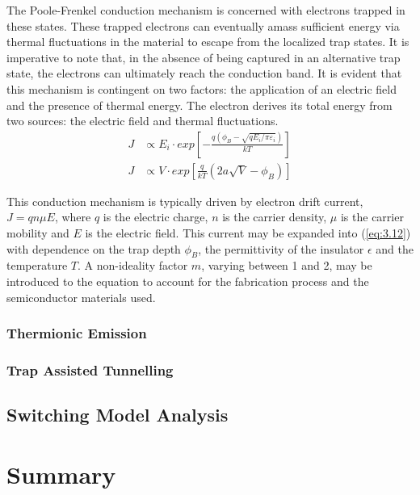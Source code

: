 \noindent The Poole-Frenkel conduction mechanism is concerned with electrons trapped in these states. These trapped electrons can eventually amass sufficient energy via thermal fluctuations in the material to escape from the localized trap states. It is imperative to note that, in the absence of being captured in an alternative trap state, the electrons can ultimately reach the conduction band. It is evident that this mechanism is contingent on two factors: the application of an electric field and the presence of thermal energy. The electron derives its total energy from two sources: the electric field and thermal fluctuations.
\begin{align}
    J &\propto E_i \cdot exp \left[ -\frac{q(\phi _{B} - \sqrt{qE_i/\pi \varepsilon _i} )}{kT} \right] \label{eq:3.12} \\
    J &\propto V \cdot exp \left[ \frac{q}{kT} \left( 2a\sqrt{V} - \phi _{B} \right) \right] \label{eq:3.13} 
\end{align}

\noindent This conduction mechanism is typically driven by electron drift current, $J=qn\mu E$, where $q$ is the electric charge, $n$ is the carrier density, $\mu$ is the carrier mobility and $E$ is the electric field. This current may be expanded into (\ref{eq:3.12}) with dependence on the trap depth $\phi_B$, the permittivity of the insulator $\epsilon$ and the temperature $T$. A non-ideality factor $m$, varying between 1 and 2, may be introduced to the equation to account for the fabrication process and the semiconductor materials used.

\subsubsection[Thermionic Emission]{Thermionic Emission}


\subsubsection[Trap Assisted Tunnelling]{Trap Assisted Tunnelling}


\subsection[Switching Model Analysis]{Switching Model Analysis}


\section[Summary]{Summary}


